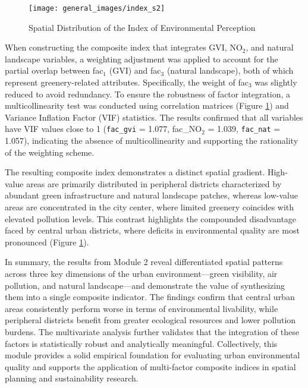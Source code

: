 \documentclass[
  12pt,
  oneside]{book}
\begin{document}
\begin{figure}

{\centering \texttt{[image: general\_images/index\_s2]} 

}

\caption{Spatial Distribution of the Index of Environmental Perception}\label{fig:indexs2}
\end{figure}

When constructing the composite index that integrates GVI, NO\(_2\), and natural landscape variables, a weighting adjustment was applied to account for the partial overlap between fac\(_1\) (GVI) and fac\(_3\) (natural landscape), both of which represent greenery-related attributes. Specifically, the weight of fac\(_3\) was slightly reduced to avoid redundancy. To ensure the robustness of factor integration, a multicollinearity test was conducted using correlation matrices (Figure \ref{fig:indexs2}) and Variance Inflation Factor (VIF) statistics. The results confirmed that all variables have VIF values close to 1 (\texttt{fac\_gvi} = 1.077, fac\_NO\(_2\) = 1.039, \texttt{fac\_nat} = 1.057), indicating the absence of multicollinearity and supporting the rationality of the weighting scheme.

The resulting composite index demonstrates a distinct spatial gradient. High-value areas are primarily distributed in peripheral districts characterized by abundant green infrastructure and natural landscape patches, whereas low-value areas are concentrated in the city center, where limited greenery coincides with elevated pollution levels. This contrast highlights the compounded disadvantage faced by central urban districts, where deficits in environmental quality are most pronounced (Figure \ref{fig:indexs2}).

In summary, the results from Module 2 reveal differentiated spatial patterns across three key dimensions of the urban environment---green visibility, air pollution, and natural landscape---and demonstrate the value of synthesizing them into a single composite indicator. The findings confirm that central urban areas consistently perform worse in terms of environmental livability, while peripheral districts benefit from greater ecological resources and lower pollution burdens. The multivariate analysis further validates that the integration of these factors is statistically robust and analytically meaningful. Collectively, this module provides a solid empirical foundation for evaluating urban environmental quality and supports the application of multi-factor composite indices in spatial planning and sustainability research.
\end{document}
